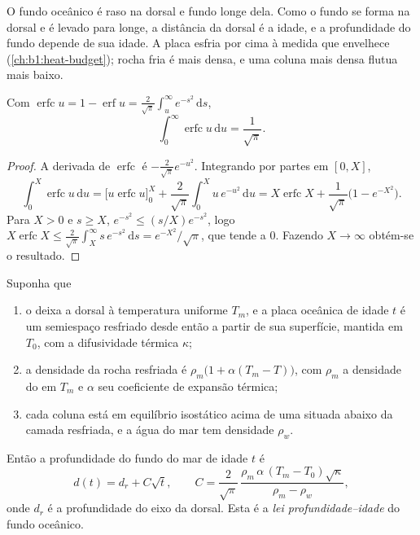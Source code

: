 O fundo oceânico é raso na dorsal e fundo longe dela. Como o fundo se forma na dorsal e é levado para longe, a distância da dorsal é a idade, e a profundidade do fundo depende de sua idade. A placa esfria por cima à medida que envelhece (\cref{ch:b1:heat-budget}); rocha fria é mais densa, e uma coluna mais densa flutua mais baixo.

\begin{lemma}\label{lem:b1:rifts-ridges-margins:erfc}
Com $\operatorname{erfc} u = 1 - \operatorname{erf} u =
\frac{2}{\sqrt\pi}\int_u^\infty e^{-s^2}\,\mathrm ds$,
\[
  \int_0^\infty \operatorname{erfc} u \,\mathrm du = \frac{1}{\sqrt\pi}.
\]
\end{lemma}

\begin{proof}
A derivada de $\operatorname{erfc}$ é $-\frac{2}{\sqrt\pi}e^{-u^2}$.
Integrando por partes em $[0, X]$,
\[
  \int_0^X \operatorname{erfc} u\,\mathrm du
  = \bigl[u \operatorname{erfc} u\bigr]_0^X + \frac{2}{\sqrt\pi}\int_0^X u\,e^{-u^2}\,\mathrm du
  = X\operatorname{erfc} X + \frac{1}{\sqrt\pi}\bigl(1 - e^{-X^2}\bigr).
\]
Para $X > 0$ e $s \ge X$, $e^{-s^2} \le (s/X)e^{-s^2}$, logo
$X\operatorname{erfc} X \le \frac{2}{\sqrt\pi}\int_X^\infty s\,e^{-s^2}\,\mathrm ds
= e^{-X^2}/\sqrt\pi$, que tende a 0. Fazendo $X \to \infty$ obtém-se o
resultado.
\end{proof}

\begin{theorem}\label{thm:b1:rifts-ridges-margins:depth-age}
Suponha que
\begin{enumerate}
  \item o  deixa a dorsal à temperatura uniforme $T_m$, e a placa oceânica de idade $t$ é um semiespaço resfriado desde então a partir de sua superfície, mantida em $T_0$, com a difusividade térmica $\kappa$;
  \item a densidade da rocha resfriada é $\rho_m\bigl(1 + \alpha(T_m -
        T)\bigr)$, com $\rho_m$ a densidade do  em $T_m$ e
        $\alpha$ seu coeficiente de expansão térmica;
  \item cada coluna está em equilíbrio isostático acima de uma 
        situada abaixo da camada resfriada, e a água do mar tem densidade $\rho_w$.
\end{enumerate}
Então a profundidade do fundo do mar de idade $t$ é
\[
  d(t) = d_r + C\sqrt t, \qquad
  C = \frac{2}{\sqrt\pi}\,\frac{\rho_m\,\alpha\,(T_m - T_0)\sqrt\kappa}{\rho_m - \rho_w},
\]
onde $d_r$ é a profundidade do eixo da dorsal. Esta é a
\emph{lei profundidade--idade} do fundo oceânico.
\end{theorem}


